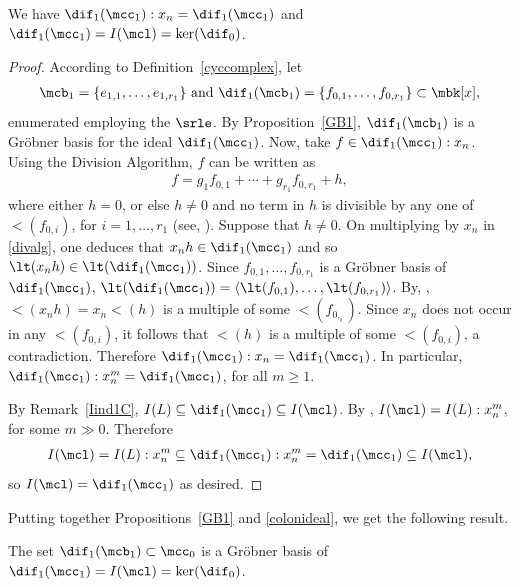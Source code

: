 \begin{proposition}\label{colonideal}
We have $\dif_1(\mcc_1):x_n=\dif_1(\mcc_1)$ and
$\dif_1(\mcc_1)=I(\mcl)=\ker(\dif_0)$.
\end{proposition}
\begin{proof}
According to Definition~\ref{cyccomplex}, let 
\begin{eqnarray*}
\mcb_1=\{e_{1,1},\ldots ,e_{1,r_1}\}\mbox{ and
}\dif_1(\mcb_1)=\{f_{0,1},\ldots ,f_{0,r_1}\}\subset \mbk[x],
\end{eqnarray*}
enumerated employing the $\srle$.  By
Proposition~\ref{GB1}, $\dif_1(\mcb_1)$ is a Gr\"obner basis for the
ideal $\dif_1(\mcc_1)$. Now, take $f\in \dif_1(\mcc_1):x_n$. Using the
Division Algorithm, $f$ can be written as
\begin{eqnarray}\label{divalg}
f=g_1f_{0,1}+\cdots +g_{r_1}f_{0,r_1}+h, 
\end{eqnarray}
where either $h=0$, or else $h\neq 0$ and no term in $h$ is divisible
by any one of $\lt(f_{0,i})$, for $i=1,\ldots ,r_1$ (see, \eg
\cite[\S~2.3, Theorem~3]{clo}). Suppose that $h\neq 0$. On multiplying
by $x_n$ in \eqref{divalg}, one deduces that $x_nh\in \dif_1(\mcc_1)$
and so $\lt(x_nh)\in \lt(\dif_1(\mcc_1))$. Since $f_{0,1},\ldots
,f_{0,r_1}$ is a Gr\"obner basis of $\dif_1(\mcc_1)$,
$\lt(\dif_1(\mcc_1))=\langle \lt(f_{0,1}),\ldots
,\lt(f_{0,r_1})\rangle$. By, \eg \cite[\S~2.4, Lemma~2]{clo},
$\lt(x_nh)=x_n\lt(h)$ is a multiple of some $\lt(f_{0,_i})$.  Since
$x_n$ does not occur in any $\lt(f_{0,i})$, it follows that $\lt(h)$
is a multiple of some $\lt(f_{0,i})$, a contradiction. Therefore
$\dif_1(\mcc_1):x_n=\dif_1(\mcc_1)$. In particular,
$\dif_1(\mcc_1):x_n^{m}=\dif_1(\mcc_1)$, for all $m\geq 1$.

By Remark~\ref{Iind1C}, $I(L)\subseteq \dif_1(\mcc_1)\subseteq
I(\mcl)$.  By \cite[Proposition~5.7]{opv}, $I(\mcl)=I(L):x_n^m$, for
some $m\gg 0$. Therefore
\begin{eqnarray*}
I(\mcl)=I(L):x_n^m\subseteq
\dif_1(\mcc_1):x_n^m=\dif_1(\mcc_1)\subseteq I(\mcl),
\end{eqnarray*}
so $I(\mcl)=\dif_1(\mcc_1)$ as desired.
\end{proof}

Putting together Propositions~\ref{GB1} and \ref{colonideal}, we get
the following result.

\begin{corollary}\label{GBI(L)}
The set $\dif_1(\mcb_1)\subset\mcc_0$ is a Gr\"obner basis of
$\dif_1(\mcc_1)=I(\mcl)=\ker(\dif_0)$.
\end{corollary}

